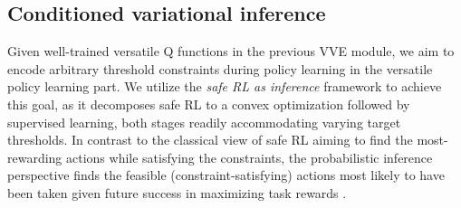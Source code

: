 
\subsection{Conditioned variational inference}
\label{subsection: Conditioned policy learing}
Given well-trained versatile Q functions in the previous VVE module, we aim to encode arbitrary threshold constraints during policy learning in the versatile policy learning part. We utilize the \textit{safe RL as inference} framework to achieve this goal, as it decomposes safe RL to a convex optimization followed by supervised learning, both stages readily accommodating varying target thresholds. In contrast to the classical view of safe RL aiming to find the most-rewarding actions while satisfying the constraints, the probabilistic inference perspective finds the feasible (constraint-satisfying) actions most likely to have been taken given future success in maximizing task rewards \cite{liu2022constrained}.

